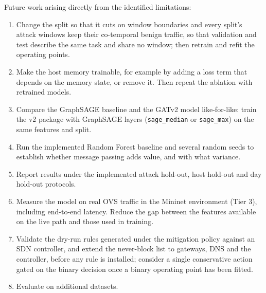 \documentclass[12pt,a4paper]{report}
\begin{document}
\begin{justify}
Future work arising directly from the identified limitations:
\begin{enumerate}
    \item Change the split so that it cuts on window boundaries and every split's attack windows keep their co-temporal benign traffic, so that validation and test describe the same task and share no window; then retrain and refit the operating points.
    \item Make the host memory trainable, for example by adding a loss term that depends on the memory state, or remove it. Then repeat the ablation with retrained models.
    \item Compare the GraphSAGE baseline and the GATv2 model like-for-like: train the v2 package with GraphSAGE layers (\texttt{sage\_median} or \texttt{sage\_max}) on the same features and split.
    \item Run the implemented Random Forest baseline and several random seeds to establish whether message passing adds value, and with what variance.
    \item Report results under the implemented attack hold-out, host hold-out and day hold-out protocols.
    \item Measure the model on real OVS traffic in the Mininet environment (Tier 3), including end-to-end latency. Reduce the gap between the features available on the live path and those used in training.
    \item Validate the dry-run rules generated under the mitigation policy against an SDN controller, and extend the never-block list to gateways, DNS and the controller, before any rule is installed; consider a single conservative action gated on the binary decision once a binary operating point has been fitted.
    \item Evaluate on additional datasets.
\end{enumerate}
\end{justify}



\newpage
\pagestyle{plain}
\renewcommand{\bibname}{References}
\printbibliography
\end{document}
